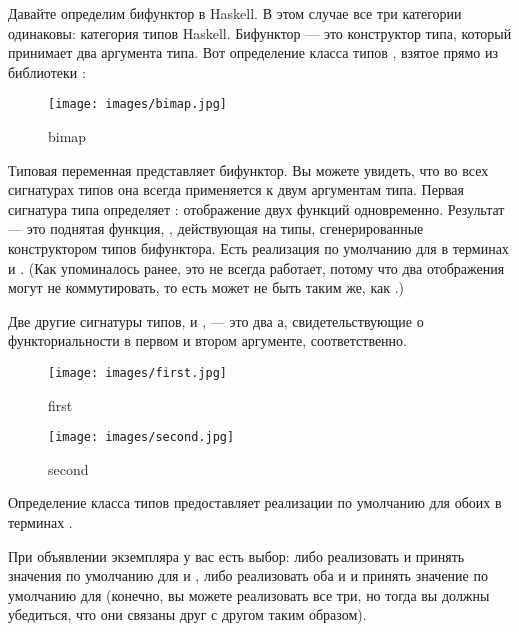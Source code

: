 Давайте определим бифунктор в Haskell. В этом случае все три категории
одинаковы: категория типов Haskell. Бифунктор --- это конструктор типа,
который принимает два аргумента типа. Вот определение класса типов
, взятое прямо из библиотеки
:


\begin{figure}[H]
  \centering\texttt{[image: images/bimap.jpg]}
  \caption{bimap}
\end{figure}

Типовая переменная  представляет бифунктор. Вы можете увидеть, что
во всех сигнатурах типов она всегда применяется к двум аргументам типа.
Первая сигнатура типа определяет : отображение двух функций
одновременно. Результат --- это поднятая функция,
, действующая на типы,
сгенерированные конструктором типов бифунктора. Есть реализация по умолчанию
для  в терминах  и
. (Как упоминалось ранее, это не всегда работает, потому что
два отображения могут не коммутировать, то есть  может не
быть таким же, как .)


\noindent
Две другие сигнатуры типов,  и , ---
это два а, свидетельствующие о функториальности  в
первом и втором аргументе, соответственно.

\begin{figure}[H]
  \centering
  \begin{minipage}{0.45\textwidth}
    \centering
    \texttt{[image: images/first.jpg]} %
    \caption{first}
  \end{minipage}\hfill
  \begin{minipage}{0.45\textwidth}
    \centering
    \texttt{[image: images/second.jpg]} %
    \caption{second}
  \end{minipage}
\end{figure}

\noindent
Определение класса типов предоставляет реализации по умолчанию для обоих
в терминах .

При объявлении экземпляра  у вас есть выбор:
либо реализовать  и принять значения по умолчанию для
 и , либо реализовать оба 
и  и принять значение по умолчанию для  (конечно,
вы можете реализовать все три, но тогда вы должны убедиться,
что они связаны друг с другом таким образом).

